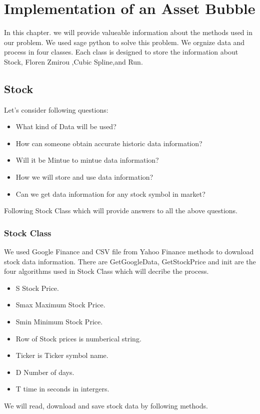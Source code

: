 \chapter{Implementation of an Asset Bubble}
In this chapter. we will provide valueable information about the methods used in our problem. 
We used sage python to solve this problem. We orgnize data and process in four classes. 
Each class is designed to store the information about Stock, Floren Zmirou
,Cubic Spline,and Run.
\section{Stock} 
Let's consider following questions: 
\begin{itemize}
  \item What kind of Data will be used?
  \item How can someone obtain accurate historic data information?
  \item Will it be Mintue to mintue data information?
  \item How we will store and use data information?
  \item Can we get data information for any stock symbol in market?
\end{itemize} 
Following Stock Class which will provide answers to all the above questions.
\subsection{Stock Class}
We used Google Finance and CSV file from Yahoo Finance methods to download stock data information.
There are GetGoogleData, GetStockPrice and init are the four algorithms used in Stock Class which will decribe the process.
\begin{itemize}
  \item S Stock Price.
  \item Smax Maximum Stock Price. 
  \item Smin Minimum Stock Price.
  \item Row of Stock prices is numberical string.
  \item Ticker is Ticker symbol name.
  \item D Number of days.
  \item T time in seconds in intergers.
\end{itemize}
We will read, download and save stock data by following methods.
